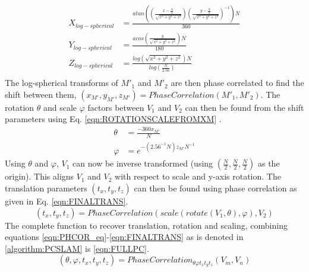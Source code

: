 \begin{equation} \label{eqn:Log_Spherical}
\begin{split}
X_{log-spherical} & = \frac{atan\left(
\left(\frac{x-\frac{N}{2}}{\sqrt{x^2+y^2+z^2}}\right)
\left(\frac{y-\frac{N}{2}}{\sqrt{x^2+y^2+z^2}}\right)^{-1}
\right)N}{360}\\
Y_{log-spherical} & = \frac{acos\left(
\frac{y}{\sqrt{x^2+y^2+z^2}}
\right)N}
{180} \\
Z_{log-spherical} & =\frac{log\left(\sqrt{x^2+y^2+z^2}\right)N}{log\left( \frac{N}{2.56} \right)} \\
\end{split}
\end{equation}
The log-spherical transforms of $M'_1$ and $M'_2$ are then phase correlated to find the shift between them, $(x_{M'},y_{M'},z_{M'}) = PhaseCorrelation(M'_1, M'_2)$. The rotation $\theta$ and scale $\varphi$ factors between $V_1$ and $V_2$ can then be found from the shift parameters using Eq. \ref{eqn:ROTATIONSCALEFROMXM} . 
\begin{equation} \label{eqn:ROTATIONSCALEFROMXM}
\begin{split}
\theta & = \frac{-360x_{M'}}{N}\\
\varphi & = e^{
-\left(
2.56^{-1}N
\right)z_{M'}N^{-1}
}
\end{split}
\end{equation}
Using $\theta$ and $\varphi$, $V_1$ can now be inverse transformed (using $(\frac{N}{2}, \frac{N}{2}, \frac{N}{2})$ as the origin). This aligns $V_1$ and $V_2$ with respect to scale and y-axis rotation. The translation parameters $(t_x, t_y, t_z)$ can then be found using phase correlation as given in Eq. \ref{eqn:FINALTRANS}.
\begin{equation} \label{eqn:FINALTRANS}
(t_x, t_y, t_z) = PhaseCorrelation(scale(rotate(V_1,\theta),\varphi), V_2)
\end{equation}
The complete function to recover translation, rotation and scaling, combining equations \ref{eqn:PHCOR_eq}-\ref{eqn:FINALTRANS} as is denoted in \ref{algorithm:PCSLAM} is \ref{eqn:FULLPC}.
\begin{equation} \label{eqn:FULLPC}
(\theta, \varphi, t_x, t_y, t_z) = PhaseCorrelation_{\theta \varphi t_x t_y t_z}(V_m, V_n)
\end{equation}

